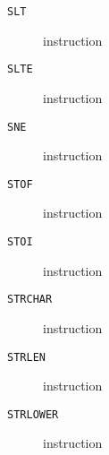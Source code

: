 \clearpage
\begin{description}
\item[\texttt{SLT}] instruction\\

\end{description}
\clearpage
\begin{description}
\item[\texttt{SLTE}] instruction\\

\end{description}
\clearpage
\begin{description}
\item[\texttt{SNE}] instruction\\

\end{description}
\clearpage
\begin{description}
\item[\texttt{STOF}] instruction\\

\end{description}
\clearpage
\begin{description}
\item[\texttt{STOI}] instruction\\

\end{description}
\clearpage
\begin{description}
\item[\texttt{STRCHAR}] instruction\\

\end{description}
\clearpage
\begin{description}
\item[\texttt{STRLEN}] instruction\\

\end{description}
\clearpage
\begin{description}
\item[\texttt{STRLOWER}] instruction\\

\end{description}

